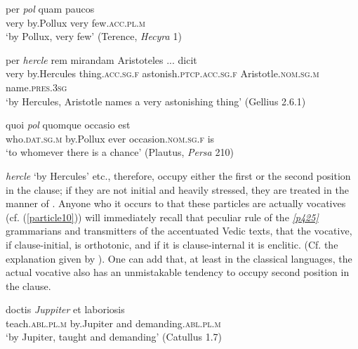 \begin{exe}
\ex
\gll per \emph{pol} quam paucos\\
very by.Pollux very few.\textsc{acc.pl.m}\\
\trans `by Pollux, very few' (Terence, \textit{Hecyra} 1) 
\label{particle7}
\end{exe}

\begin{exe}
\ex
\gll per \emph{hercle} rem mirandam Aristoteles ... dicit\\
very by.Hercules thing.\textsc{acc.sg.f} astonish.\textsc{ptcp.acc.sg.f} Aristotle.\textsc{nom.sg.m} ~ name.\textsc{pres.3sg}\\
\trans `by Hercules, Aristotle names a very astonishing thing' (Gellius 2.6.1) 
\label{particle8}
\end{exe}

\begin{exe}
\ex
\gll quoi \emph{pol} quomque occasio est\\
who.\textsc{dat.sg.m} by.Pollux ever occasion.\textsc{nom.sg.f} is\\
\trans `to whomever there is a chance' (Plautus, \textit{Persa} 210) 
\label{particle9}
\end{exe}

\emph{hercle} `by Hercules' etc., therefore, occupy either the first or the second position in the clause; if they are not initial and heavily stressed, they are treated in the manner of . Anyone who it occurs to that these particles are actually vocatives (cf. (\ref{particle10})) will immediately recall that peculiar rule of the  \hyperlink{p425}{\emph{[p425]}} grammarians and transmitters of the accentuated Vedic texts, that the vocative, if clause-initial, is orthotonic, and if it is clause-internal it is enclitic. (Cf. the explanation given by \citealp[34ff.]{Delbrueck1888}). One can add that, at least in the classical languages, the actual vocative also has an unmistakable tendency to occupy second position in the clause.

\begin{exe}
\ex
\gll doctis \emph{Juppiter} et laboriosis\\
teach.\textsc{abl.pl.m} by.Jupiter and demanding.\textsc{abl.pl.m}\\
\trans `by Jupiter, taught and demanding' (Catullus 1.7) 
\label{particle10}
\end{exe}

